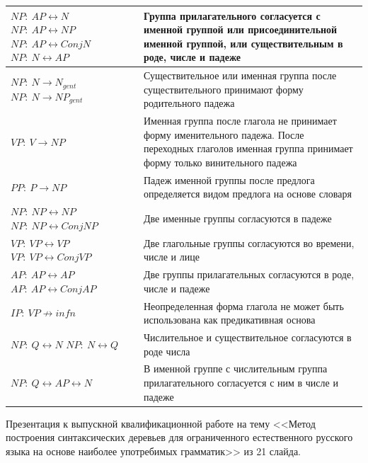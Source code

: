 \begin{longtable}{|L{.3\textwidth}|p{.6\textwidth}|}
	$NP:\ AP \leftrightarrow N$\newline
	$NP:\ AP \leftrightarrow NP$\newline
	$NP:\ AP \leftrightarrow ConjN$\newline
	$NP:\ N \leftrightarrow AP$ &
	Группа прилагательного согласуется с именной группой или присоединительной именной группой, или существительным в роде, числе и падеже\\\hline
	
	$NP:\ N \rightarrow N_{gent}$\newline
	$NP:\ N \rightarrow NP_{gent}$ &
	Существительное или именная группа после существительного принимают форму родительного падежа\\\hline
	
	$VP:\ V \rightarrow NP$ &
	Именная группа после глагола не принимает форму именительного падежа. После переходных глаголов именная группа принимает форму только винительного падежа\\\hline
	
	$PP:\ P \rightarrow NP$ &
	Падеж именной группы после предлога определяется видом предлога на основе словаря\\\hline
	
	$NP:\ NP \leftrightarrow NP$\newline
	$NP:\ NP \leftrightarrow ConjNP$ &
	Две именные группы согласуются в падеже\\\hline
	
	$VP:\ VP \leftrightarrow VP$\newline
	$VP:\ VP \leftrightarrow ConjVP$ &
	Две глагольные группы согласуются во времени, числе и лице\\\hline
	
	$AP:\ AP \leftrightarrow AP$\newline
	$AP:\ AP \leftrightarrow ConjAP$ &
	Две группы прилагательных согласуются в роде, числе и падеже\\\hline
	
	$IP:\ VP \not\rightarrow infn$ &
	Неопределенная форма глагола не может быть использована как предикативная основа \\\hline
	
	$NP:\ Q \leftrightarrow N$\newline
	$NP:\ N \leftrightarrow Q$ &
	Числительное и существительное согласуются в роде числа\\\hline
	
	$NP:\ Q \leftrightarrow AP \leftrightarrow N$ &
	В именной группе с числительным группа прилагательного согласуется с ним в числе и падеже\\\hline
	
\end{longtable}
\egroup
\normalsize
\newpage
{}

Презентация к выпускной квалификационной работе на тему <<Метод построения синтаксических деревьев для ограниченного естественного русского языка на основе наиболее употребимых грамматик>> из 21 слайда.

\newpage